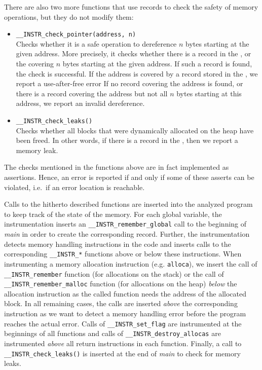 There are also two more functions that use records to check
the safety of memory operations, but they do not modify them:
\begin{itemize}
\item \texttt{\_\_INSTR\_check\_pointer(address, n)}
  \\Checks whether it is a safe operation to dereference $n$ bytes
  starting at the given address. More precisely, it checks whether
  there is a record in the \stacklist, \heaplist or the \globalslist
  covering $n$ bytes starting at the given address.  If such a record
  is found, the check is successful. If the address is covered by a
  record stored in the \dealloclist, we report a use-after-free error
  If no record covering the address is found, or there is a record
  covering the address but not all $n$ bytes starting at this address,
  we report an invalid dereference.
\item \texttt{\_\_INSTR\_check\_leaks()}
  \\Checks whether all blocks that were dynamically allocated on the heap have been
  freed. In other words, if there is a record in the \heaplist, then we report
  a memory leak.
\end{itemize}

The checks mentioned in the functions above
are in fact implemented as assertions. Hence, an error is reported if
and only if some of these asserts can be violated, i.e.~if an error
location is reachable.

Calls to the hitherto described functions are inserted into the analyzed
program to keep track of the state of the memory. For each global variable,
the instrumentation inserts an \texttt{\_\_INSTR\_remember\_global} call to the
beginning of \emph{main} in order to create the corresponding record. Further,
the instrumentation detects memory handling instructions in the code and
inserts calls to the corresponding \texttt{\_\_INSTR\_*} functions above or
below these instructions. When instrumenting a memory allocation instruction
(e.g. \texttt{alloca}), we insert the call of \texttt{\_\_INSTR\_remember}
function (for allocations on the stack) or the call of
\texttt{\_\_INSTR\_remember\_malloc} function (for allocations on the heap)
\emph{below} the allocation instruction as the called function needs the
address of the allocated block. In all remaining cases, the calls are inserted
\emph{above} the corresponding instruction as we want to detect a memory
handling error before the program reaches the actual error.  Calls of
\texttt{\_\_INSTR\_set\_flag} are instrumented at the beginnings of all
functions and calls of \texttt{\_\_INSTR\_destroy\_allocas} are instrumented
\emph{above} all return instructions in each function. Finally, a call to
\texttt{\_\_INSTR\_check\_leaks()} is inserted at the end of \emph{main} to
check for memory leaks.

